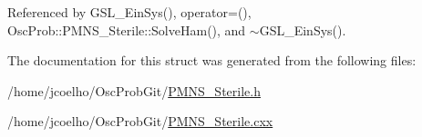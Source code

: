 Referenced by G\+S\+L\+\_\+\+Ein\+Sys(), operator=(), Osc\+Prob\+::\+P\+M\+N\+S\+\_\+\+Sterile\+::\+Solve\+Ham(), and $\sim$\+G\+S\+L\+\_\+\+Ein\+Sys().



The documentation for this struct was generated from the following files\+:\begin{DoxyCompactItemize}
\item 
/home/jcoelho/\+Osc\+Prob\+Git/\hyperlink{PMNS__Sterile_8h}{P\+M\+N\+S\+\_\+\+Sterile.\+h}\item 
/home/jcoelho/\+Osc\+Prob\+Git/\hyperlink{PMNS__Sterile_8cxx}{P\+M\+N\+S\+\_\+\+Sterile.\+cxx}\end{DoxyCompactItemize}
